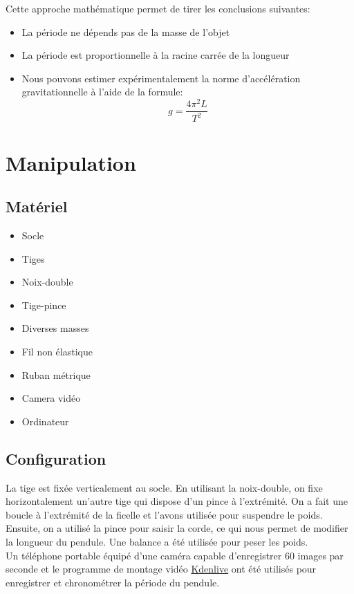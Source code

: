 \documentclass[12pt,a4paper]{article}
\begin{document}
    Cette approche mathématique permet de tirer les conclusions suivantes:
    \begin{itemize}
        \item La période ne dépends pas de la masse de l'objet
        \item La période est proportionnelle à la racine carrée de la longueur
        \item Nous pouvons estimer expérimentalement la norme d'accélération gravitationnelle à l'aide de la formule: 
        \begin{equation*}
            g=\frac{4\pi^2L}{T^2}
        \end{equation*}
    \end{itemize}

    \section{Manipulation}
    \subsection{Matériel}
    \begin{minipage}{0.5\textwidth}
        \begin{itemize}
            \item Socle
            \item Tiges
            \item Noix-double
            \item Tige-pince
            \item Diverses masses
        \end{itemize}
    \end{minipage}
    \begin{minipage}{0.5\textwidth}
        \begin{itemize}
            \item Fil non élastique
            \item Ruban métrique
            \item Camera vidéo
            \item Ordinateur
        \end{itemize}
    \end{minipage}
    \subsection{Configuration}
    La tige est fixée verticalement au socle. En utilisant la noix-double, on fixe horizontalement un'autre tige qui dispose d'un pince à l'extrémité. On a fait une boucle à l'extrémité de la ficelle et l'avons utilisée pour suspendre le poids.
    Ensuite, on a utilisé la pince pour saisir la corde, ce qui nous permet de modifier la longueur du pendule. Une balance a été utilisée pour peser les poids. \\
    Un téléphone portable équipé d'une caméra capable d'enregistrer 60 images par seconde et le programme de montage vidéo \href{https://kdenlive.org}{Kdenlive} ont été utilisés pour enregistrer et chronométrer la période du pendule. \\
\end{document}
